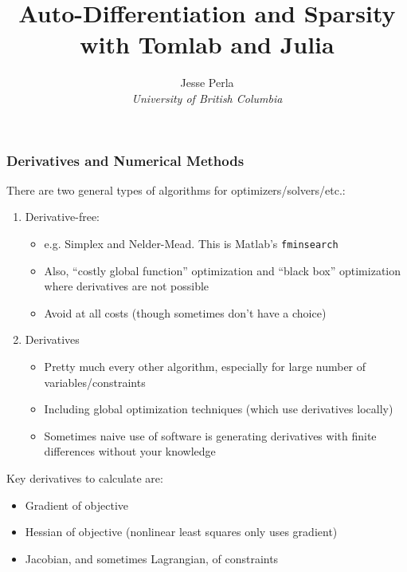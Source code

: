 \documentclass[nofootline]{etk-presentation}
\begin{document}
\title{Auto-Differentiation and Sparsity with Tomlab and Julia}
\author[Jesse Perla]{\large Jesse Perla \\ {\small \textit{University of British Columbia}}}
\maketitle
	\begin{frame}\frametitle{}
	\bigskip
	\bigskip
	\bigskip	
	\begin{center}
		{\huge {}}
	\end{center}
\end{frame}
\begin{frame}[fragile]	\frametitle{Derivatives and Numerical Methods}
	There are two general types of algorithms for optimizers/solvers/etc.:
	\begin{enumerate}
		\item Derivative-free:
		\begin{itemize}
			\item e.g. Simplex and Nelder-Mead.  This is Matlab's \verb|fminsearch|
			\item Also, ``costly global function'' optimization and ``black box'' optimization where derivatives are not possible
			\item Avoid at all costs (though sometimes don't have a choice)
		\end{itemize}
	\bigskip
		\item Derivatives
		\begin{itemize}
			\item Pretty much every other algorithm, especially for large number of variables/constraints
			\item Including global optimization techniques (which use derivatives locally)
			\item Sometimes naive use of software is generating derivatives with finite differences without your knowledge
		\end{itemize}	
	\end{enumerate}
\bigskip
Key derivatives to calculate are:
\begin{itemize}
	\item Gradient of objective
	\item Hessian of objective (nonlinear least squares only uses gradient)
	\item Jacobian, and sometimes Lagrangian, of constraints
\end{itemize}


\end{frame}
\end{document}
